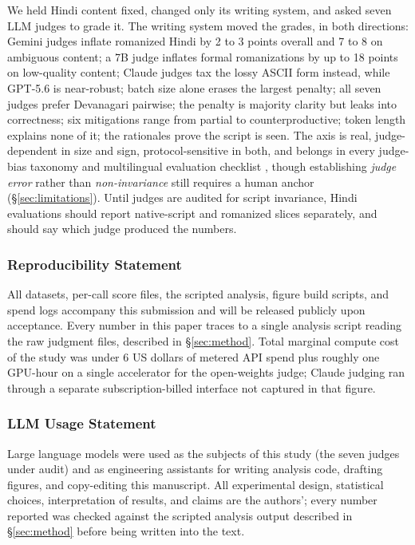 We held Hindi content fixed, changed only its writing system, and asked seven LLM judges to grade it. The writing system moved the grades, in both directions: Gemini judges inflate romanized Hindi by 2 to 3 points overall and 7 to 8 on ambiguous content; a 7B judge inflates formal romanizations by up to 18 points on low-quality content; Claude judges tax the lossy ASCII form instead, while GPT-5.6 is near-robust; batch size alone erases the largest penalty; all seven judges prefer Devanagari pairwise; the penalty is majority clarity but leaks into correctness; six mitigations range from partial to counterproductive; token length explains none of it; the rationales prove the script is seen. The axis is real, judge-dependent in size and sign, protocol-sensitive in both, and belongs in every judge-bias taxonomy \citep{ye2024justice, zhou2026judgebiasbench} and multilingual evaluation checklist \citep{hada2024evaluators, son2024mmeval}, though establishing \emph{judge error} rather than \emph{non-invariance} still requires a human anchor (\S\ref{sec:limitations}). Until judges are audited for script invariance, Hindi evaluations should report native-script and romanized slices separately, and should say which judge produced the numbers.

\subsubsection*{Reproducibility Statement}
All datasets, per-call score files, the scripted analysis, figure build scripts, and spend logs accompany this submission and will be released publicly upon acceptance. Every number in this paper traces to a single analysis script reading the raw judgment files, described in \S\ref{sec:method}. Total marginal compute cost of the study was under 6 US dollars of metered API spend plus roughly one GPU-hour on a single accelerator for the open-weights judge; Claude judging ran through a separate subscription-billed interface not captured in that figure.

\subsubsection*{LLM Usage Statement}
Large language models were used as the subjects of this study (the seven judges under audit) and as engineering assistants for writing analysis code, drafting figures, and copy-editing this manuscript. All experimental design, statistical choices, interpretation of results, and claims are the authors'; every number reported was checked against the scripted analysis output described in \S\ref{sec:method} before being written into the text.
